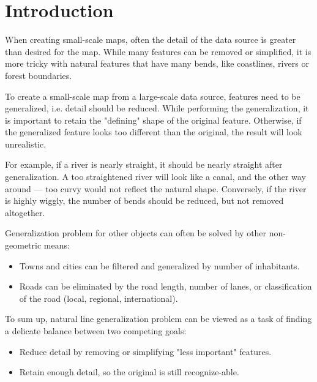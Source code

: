 \documentclass[a4paper]{article}
\begin{document}
\section{Introduction}
\label{sec:introduction}

When creating small-scale maps, often the detail of the data source is greater
than desired for the map. While many features can be removed or simplified, it
is more tricky with natural features that have many bends, like coastlines,
rivers or forest boundaries.

To create a small-scale map from a large-scale data source, features need to be
generalized, i.e. detail should be reduced. While performing the generalization, it
is important to retain the "defining" shape of the original feature. Otherwise,
if the generalized feature looks too different than the original, the result
will look unrealistic.

For example, if a river is nearly straight, it should be nearly straight after
generalization. A too straightened river will look like a canal, and the other
way around --- too curvy would not reflect the natural shape. Conversely, if
the river is highly wiggly, the number of bends should be reduced, but not
removed altogether.

Generalization problem for other objects can often be solved by other
non-geometric means:

\begin{itemize}
    \item Towns and cities can be filtered and generalized by number of
        inhabitants.
    \item Roads can be eliminated by the road length, number of lanes, or
        classification of the road (local, regional, international).
\end{itemize}

To sum up, natural line generalization problem can be viewed as a task of
finding a delicate balance between two competing goals:

\begin{itemize}
    \item Reduce detail by removing or simplifying "less important" features.
    \item Retain enough detail, so the original is still recognize-able.
\end{itemize}
\end{document}
